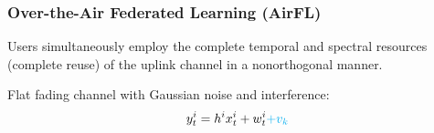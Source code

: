 \begin{frame}
\frametitle{Over-the-Air Federated Learning (AirFL)}

Users simultaneously employ the complete temporal and spectral resources (complete reuse) of the uplink channel in a nonorthogonal manner.
\vspace{-1em}
\begin{figure}
\centering
{}
\end{figure}

Flat fading channel with Gaussian noise and {\color{cyan}interference}:
$$y^i_t = h^ix^i_t + w^i_t {\color{cyan} + v_k}$$

\end{frame}


